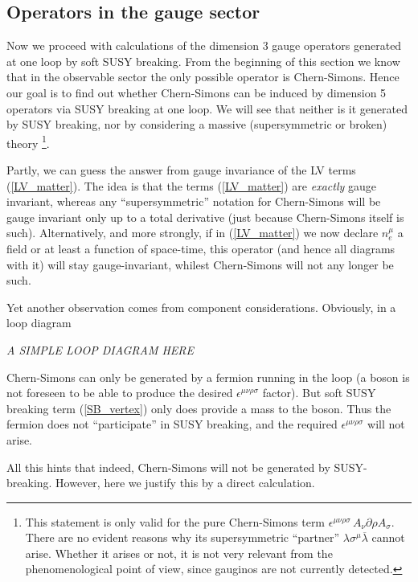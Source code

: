 \documentclass[a4paper,12pt]{article}
\begin{document}
\subsection{Operators in the gauge sector}
\label{SB_gauge_sector}

	Now we proceed with calculations of the dimension 3 gauge
	operators generated at one loop by soft SUSY breaking.
	From the beginning of this section we know that in the observable
	sector the only possible operator is Chern-Simons.
	Hence our goal is to find out whether Chern-Simons can
	be induced by dimension 5 operators via SUSY breaking at one 
	loop.
	We will see that neither is it generated by SUSY breaking,
	nor by considering a massive (supersymmetric or
	broken) theory
\footnote{
 	This statement is only valid for the pure Chern-Simons term
	$ \epsilon^{\mu\nu\rho\sigma}\, A_\nu \partial\rho A_\sigma $.
	There are no evident reasons why its supersymmetric 
	``partner'' 
	$ \lambda \sigma^\mu \overline{\lambda} $
	cannot arise.
	Whether it arises or not, it is not very relevant from
	the phenomenological point of view, since gauginos are not
	currently detected.
	}.

	Partly, we can guess the answer from gauge invariance of
	the LV terms (\ref{LV_matter}). 
	The idea is that the terms (\ref{LV_matter}) are 
	{\it exactly} gauge invariant, whereas any ``supersymmetric''
	notation for Chern-Simons will be gauge invariant only
	up to a total derivative (just because Chern-Simons itself
	is such).
	Alternatively, and more strongly, if in (\ref{LV_matter})
	we now declare $ n_e^\mu $ a field or at least a function
	of space-time, this operator (and hence all diagrams with it) 
	will stay gauge-invariant, whilest Chern-Simons
	will not any longer be such.

	Yet another observation comes from component considerations.
	Obviously, in a loop diagram

	\emph{A SIMPLE LOOP DIAGRAM HERE}

	Chern-Simons can only be generated by a fermion running in
	the loop 
	(a boson is not foreseen to be able to produce the desired
	$ \epsilon^{\mu\nu\rho\sigma} $ factor).
	But soft SUSY breaking term (\ref{SB_vertex}) only 
	does provide a mass to the boson.
	Thus the fermion does not ``participate'' in SUSY breaking,
	and the required $ \epsilon^{\mu\nu\rho\sigma} $ 
	will not arise.

	All this hints that indeed, Chern-Simons will not be
	generated by SUSY-breaking. 
	However, here we justify this by a direct calculation.
\end{document}
